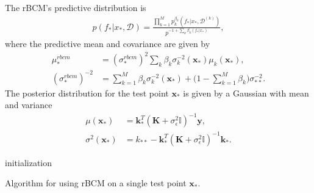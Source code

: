 \documentclass[twoside,english]{uiofysmaster}
\begin{document}
The rBCM's predictive distribution is
\begin{align}
p(f_*|x_*, \mathcal{D}) = \frac{\prod_{k=1}^Mp_k^{\beta_k} (f_*|x_*, \mathcal{D}^{(k)}) }{p^{-1+ \sum_k \beta_k (f_*|x_*)}},
\end{align}
where the predictive mean and covariance are given by
\begin{align}
\mu_*^{rbcm} &= (\sigma_*^{rbcm})^2 \sum_k \beta_k \sigma_k^{-2} (\textbf{x}_*) \mu_k (\textbf{x}_*),\\
(\sigma_*^{rbcm})^{-2} &= \sum_{k=1}^M \beta_k \sigma_k^{-2} (\textbf{x}_*) + \big(1 - \sum_{k=1}^M \beta_k \big) \sigma_{**}^{-2}.
\end{align}
The posterior distribution for the test point $\textbf{x}_*$ is given by a Gaussian with mean and variance
\begin{align}
\mu (\textbf{x}_*) &= \textbf{k}_*^T (\textbf{K} + \sigma_{\epsilon}^2 \mathbb{I})^{-1} \textbf{y},\\
\sigma^2(\textbf{x}_*) &= k_{**} - \textbf{k}_*^T(\textbf{K} + \sigma_{\epsilon}^2 \mathbb{I})^{-1} \textbf{k}_*.
\end{align}


\begin{algorithm}[H]
 initialization\;
 \caption{Algorithm for using rBCM on a single test point $\textbf{x}_*$.}
\end{algorithm}




\end{document}
